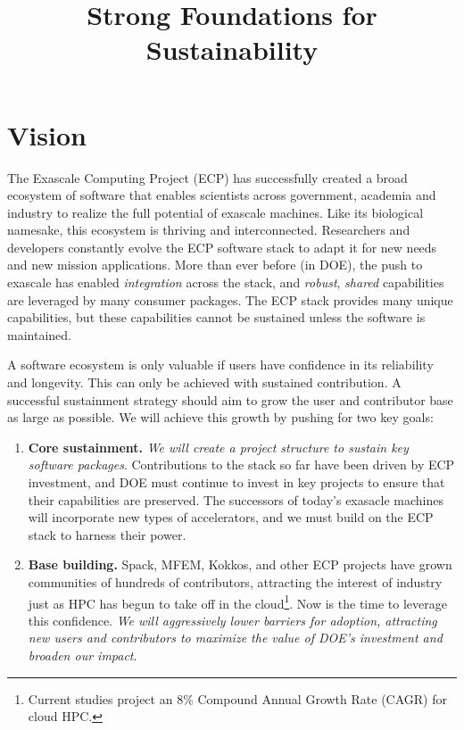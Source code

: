 \documentclass[11pt]{article}
\title{\vspace{-3em}\sf\huge\color{secblue}%
Strong Foundations for Sustainability}
\date{\vspace{-6em}}
\begin{document}
\setcounter{page}{1}

\maketitle

\section{Vision}

The Exascale Computing Project (ECP) has successfully created a broad ecosystem of
software that enables scientists across government, academia and industry to realize the
full potential of exascale machines. Like its biological namesake, this ecosystem is
thriving and interconnected. Researchers and developers constantly evolve the ECP
software stack to adapt it for new needs and new mission applications. More than ever
before (in DOE), the push to exascale has enabled {\it integration} across the stack,
and {\it robust}, {\it shared} capabilities are leveraged by many consumer packages. The
ECP stack provides many unique capabilities, but these capabilities cannot be sustained
unless the software is maintained.

A software ecosystem is only valuable if users have confidence in its reliability and
longevity. This can only be achieved with sustained contribution. A successful
sustainment strategy should aim to grow the user and contributor base as large as
possible. We will achieve this growth by pushing for two key goals:

\begin{enumerate}
\item {\bf Core sustainment.} {\it We will create a project structure to sustain key
  software packages}. Contributions to the stack so far have been driven by ECP
  investment, and DOE must continue to invest in key projects to ensure that their
  capabilities are preserved. The successors of today's exasacle machines will
  incorporate new types of accelerators, and we must build on the ECP stack to harness
  their power.
\item {\bf Base building.} Spack, MFEM, Kokkos, and other ECP projects have grown
  communities of hundreds of contributors, attracting the interest of industry just as
  HPC has begun to take off in the cloud\footnote{Current studies project an 8\%
  Compound Annual Growth Rate (CAGR) for cloud HPC.}. Now is the time to leverage this
  confidence. {\it We will aggressively lower barriers for adoption, attracting new
    users and contributors to maximize the value of DOE's investment and broaden our
    impact}.
\end{enumerate}
\end{document}
